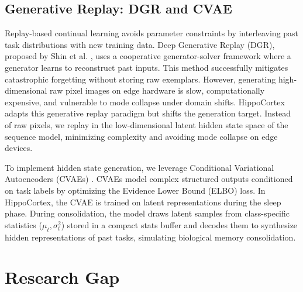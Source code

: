 \subsection{Generative Replay: DGR and CVAE}

Replay-based continual learning avoids parameter constraints by interleaving past task distributions with new training data. Deep Generative Replay (DGR), proposed by Shin et al. \cite{shinContinualLearningDeep2017}, uses a cooperative generator-solver framework where a generator learns to reconstruct past inputs. This method successfully mitigates catastrophic forgetting without storing raw exemplars. However, generating high-dimensional raw pixel images on edge hardware is slow, computationally expensive, and vulnerable to mode collapse under domain shifts. HippoCortex adapts this generative replay paradigm but shifts the generation target. Instead of raw pixels, we replay in the low-dimensional latent hidden state space of the sequence model, minimizing complexity and avoiding mode collapse on edge devices.

To implement hidden state generation, we leverage Conditional Variational Autoencoders (CVAEs) \cite{sohnLearningStructuredOutput2015}. CVAEs model complex structured outputs conditioned on task labels by optimizing the Evidence Lower Bound (ELBO) loss. In HippoCortex, the CVAE is trained on latent representations during the sleep phase. During consolidation, the model draws latent samples from class-specific statistics ($\mu_t, \sigma_t^2$) stored in a compact stats buffer and decodes them to synthesize hidden representations of past tasks, simulating biological memory consolidation.

\section{Research Gap}
\label{sec:research_gap}

